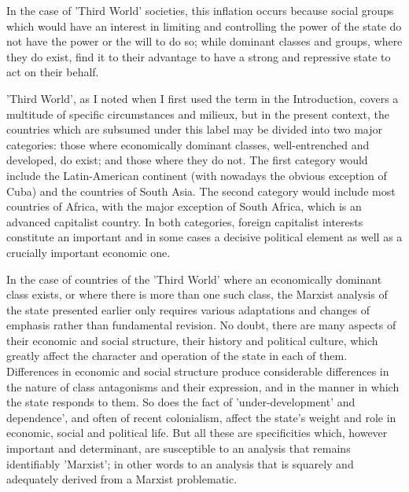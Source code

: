 In the case of 'Third World' societies, this inflation occurs because social groups which would have an interest in limiting and controlling the power of the state do not have the power or the will to do so; while dominant classes and groups, where they do exist, find it to their advantage to have a strong and repressive state to act on their behalf.

'Third World', as I noted when I first used the term in the Introduction, covers a multitude of specific circumstances and milieux, but in the present context, the countries which are subsumed under this label may be divided into two major categories: those where economically dominant classes, well\hyp{}entrenched and developed, do exist; and those where they do not. The first category would include the Latin-American continent (with nowadays the obvious exception of Cuba) and the countries of South Asia. The second category would include most countries of Africa, with the major exception of South Africa, which is an advanced capitalist country. In both categories, foreign capitalist interests constitute an important and in some cases a decisive political element as well as a crucially important economic one.

In the case of countries of the 'Third World' where an economically dominant class exists, or where there is more than one such class, the Marxist analysis of the state presented earlier only requires various adaptations and changes of emphasis rather than fundamental revision. No doubt, there are many aspects of their economic and social structure, their history and political culture, which greatly affect the character and operation of the state in each of them. Differences in economic and social structure produce considerable differences in the nature of class antagonisms and their expression, and in the manner in which the state responds to them. So does the fact of 'under\hyp{}development' and dependence', and often of recent colonialism, affect the state's weight and role in economic, social and political life. But all these are specificities which, however important and determinant, are susceptible to an analysis that remains identifiably 'Marxist'; in other words to an analysis that is squarely and adequately derived from a Marxist problematic.

